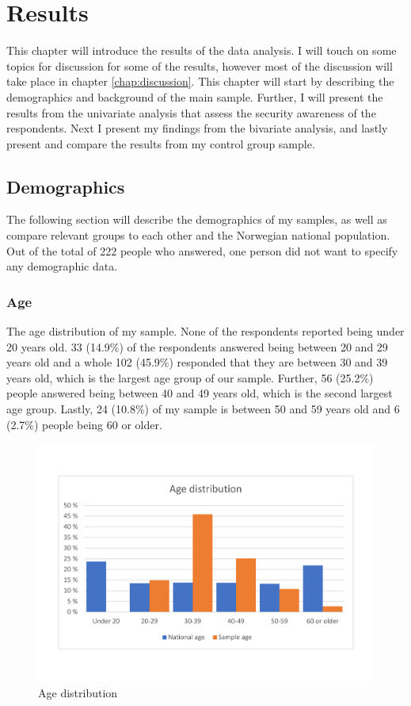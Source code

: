 \chapter{Results}
\label{chap:results}
This chapter will introduce the results of the data analysis. I will touch on some topics for discussion for some of the results, however most of the discussion will take place in chapter \ref{chap:discussion}. This chapter will start by describing the demographics and background of the main sample. Further, I will present the results from the univariate analysis that assess the security awareness of the respondents. Next I present my findings from the bivariate analysis, and lastly present and compare the results from my control group sample. 

\section{Demographics}

The following section will describe the demographics of my samples, as well as compare relevant groups to each other and the Norwegian national population. Out of the total of 222 people who answered, one person did not want to specify any demographic data. 

\subsection{Age}
The age distribution of my sample. None of the respondents reported being under 20 years old. 33 (14.9\%) of the respondents answered being between 20 and 29 years old and a whole 102 (45.9\%) responded that they are between 30 and 39 years old, which is the largest age group of our sample. Further, 56 (25.2\%) people answered being between 40 and 49 years old, which is the second largest age group. Lastly, 24 (10.8\%) of my sample is between 50 and 59 years old and 6 (2.7\%) people being 60 or older. 
\begin{figure}[!h]
    \centering
    \includegraphics[scale=0.45]{figures/diagrams/age_ssb.pdf}
    \caption{Age distribution}
    \label{fig:age}
\end{figure}

